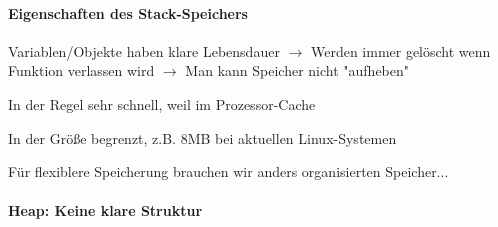 \documentclass[10pt]{article}
\begin{document}
\paragraph{Eigenschaften des Stack-Speichers}

\begin{itemize*}
  \item Variablen/Objekte haben klare Lebensdauer $\rightarrow$ Werden immer gelöscht wenn Funktion verlassen wird  $\rightarrow$ Man kann Speicher nicht "aufheben"
  \item In der Regel sehr schnell, weil im Prozessor-Cache
  \item In der Größe begrenzt, z.B. 8MB bei aktuellen Linux-Systemen
  \item Für flexiblere Speicherung brauchen wir anders organisierten Speicher...
\end{itemize*}

\paragraph{Heap: Keine klare Struktur}
\end{document}
